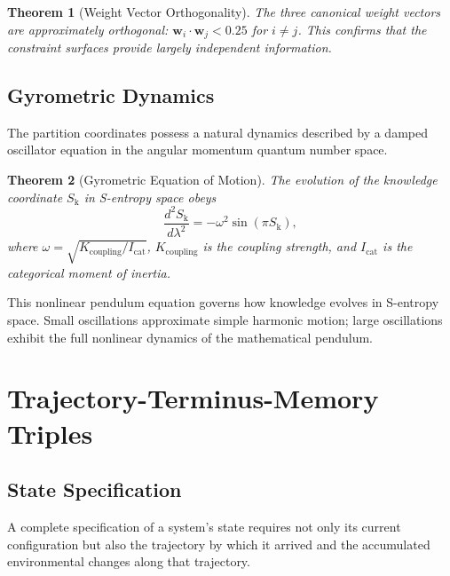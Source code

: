 \documentclass[twocolumn,10pt]{article}
\newtheorem{theorem}{Theorem}[section]
\newcommand{\Sk}{S_{\mathrm{k}}}
\begin{document}
\begin{theorem}[Weight Vector Orthogonality]
\label{thm:orthogonality}
The three canonical weight vectors are approximately orthogonal: $\mathbf{w}_{i} \cdot \mathbf{w}_{j} < 0.25$ for $i \neq j$.  This confirms that the constraint surfaces provide largely independent information.
\end{theorem}

\subsection{Gyrometric Dynamics}

The partition coordinates possess a natural dynamics described by a damped oscillator equation in the angular momentum quantum number space.

\begin{theorem}[Gyrometric Equation of Motion]
\label{thm:gyro}
The evolution of the knowledge coordinate $\Sk$ in S-entropy space obeys
\begin{equation}
  \frac{d^{2}\Sk}{d\lambda^{2}} = -\omega^{2} \sin(\pi \Sk),
  \label{eq:gyro}
\end{equation}
where $\omega = \sqrt{K_{\mathrm{coupling}} / I_{\mathrm{cat}}}$, $K_{\mathrm{coupling}}$ is the coupling strength, and $I_{\mathrm{cat}}$ is the categorical moment of inertia.
\end{theorem}

This nonlinear pendulum equation governs how knowledge evolves in S-entropy space.  Small oscillations approximate simple harmonic motion; large oscillations exhibit the full nonlinear dynamics of the mathematical pendulum.

\section{Trajectory-Terminus-Memory Triples}
\label{sec:trajectories}

\subsection{State Specification}

A complete specification of a system's state requires not only its current configuration but also the trajectory by which it arrived and the accumulated environmental changes along that trajectory.
\end{document}
